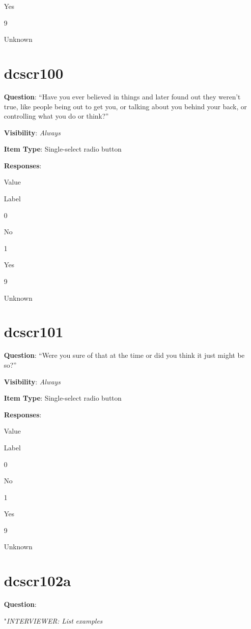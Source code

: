 \documentclass[]{book}
\begin{document}
Yes

9

Unknown

\hypertarget{dcscr100}{%
\section{dcscr100}\label{dcscr100}}

\textbf{Question}: ``Have you ever believed in things and later found out they weren't true, like people being out to get you, or talking about you behind your back, or controlling what you do or think?''

\textbf{Visibility}: \emph{Always}

\textbf{Item Type}: Single-select radio button

\textbf{Responses}:

Value

Label

0

No

1

Yes

9

Unknown

\hypertarget{dcscr101}{%
\section{dcscr101}\label{dcscr101}}

\textbf{Question}: ``Were you sure of that at the time or did you think it just might be so?''

\textbf{Visibility}: \emph{Always}

\textbf{Item Type}: Single-select radio button

\textbf{Responses}:

Value

Label

0

No

1

Yes

9

Unknown

\hypertarget{dcscr102a}{%
\section{dcscr102a}\label{dcscr102a}}

\textbf{Question}:

"\emph{INTERVIEWER: List examples}
\end{document}
